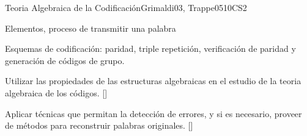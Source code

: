 \begin{syllabus}
\begin{unit}{}{Teoria Algebraica de la Codificación}{Grimaldi03, Trappe05}{10}{CS2}
   \begin{topics}
    	\item  Elementos, proceso de transmitir una palabra
    	\item Esquemas de codificación: paridad, triple repetición, verificación de paridad y generación de códigos de grupo.
	 \end{topics}
   \begin{learningoutcomes}
      	\item  Utilizar las propiedades de las estructuras algebraicas en el estudio  de la teoria algebraica de los códigos. [\Familiarity]
	 \item Aplicar técnicas que permitan la detección de errores, y si es necesario, proveer de métodos para reconstruir palabras originales. [\Usage]
   \end{learningoutcomes}
\end{unit}







\begin{coursebibliography}
\end{coursebibliography}

\end{syllabus}



